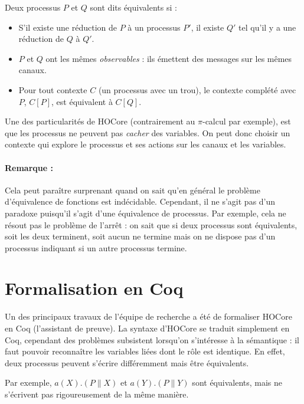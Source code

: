 \documentclass[11pt]{article}
\def\pic{$\pi$-calcul }
\begin{document}
Deux processus $P$ et $Q$ sont dits équivalents si :
\begin{itemize}
\item S'il existe une réduction de $P$ à un processus $P'$, il existe $Q'$ tel qu'il y a une réduction de $Q$ à $Q'$. 
\item $P$ et $Q$ ont les mêmes \textit{observables} : ils émettent des messages sur les mêmes canaux.  
\item Pour tout contexte $C$ (un processus avec un trou), le contexte complété avec $P$, $C[P]$, est équivalent à $C[Q]$.
\end{itemize}
Une des particularités de HOCore (contrairement au \pic par exemple), est que les processus ne peuvent pas \textit{cacher} des variables. On peut donc choisir un contexte qui explore le processus et ses actions sur les canaux et les variables. 


\paragraph{Remarque :} Cela peut paraître surprenant quand on sait qu'en général le problème d'équivalence de fonctions est indécidable. Cependant, il ne s'agit pas d'un paradoxe puisqu'il s'agit d'une équivalence de processus. Par exemple, cela ne résout pas le problème de l'arrêt : on sait que si deux processus sont équivalents, soit les deux terminent, soit aucun ne termine mais on ne dispose pas d'un processus indiquant si un autre processus termine. 

\section{Formalisation en Coq}
Un des principaux travaux de l'équipe de recherche a été de formaliser HOCore en Coq (l'assistant de preuve).
La syntaxe d'HOCore se traduit simplement en Coq, cependant des problèmes subsistent lorsqu'on s'intéresse à la sémantique : il faut pouvoir reconnaître les variables liées dont le rôle est identique. En effet, deux processus peuvent s'écrire différemment mais être équivalents.

Par exemple, $a(X).(P\|X)$ et $a(Y).(P\|Y)$ sont équivalents, mais ne s'écrivent pas rigoureusement de la même manière.
\end{document}
